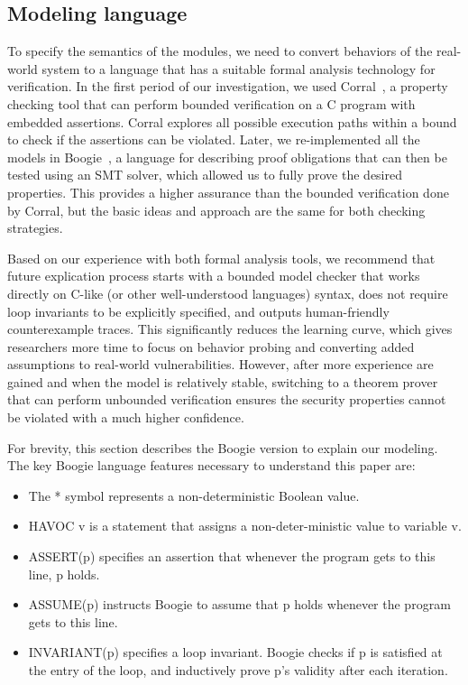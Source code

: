 \subsection{Modeling language}

To specify the semantics of the modules, we need to convert behaviors of the real-world system to a language that has a suitable formal analysis technology for verification.  In the first period of our investigation, we used Corral~\cite{Lal:2012:SRM:2362216.2362257}, a property checking tool that can perform bounded verification on a C program with embedded assertions.  Corral explores all possible execution paths within a bound to check if the assertions can be violated.  Later, we re-implemented all the models in Boogie~\cite{Boogie}, a language for describing proof obligations that can then be tested using an SMT solver, which allowed us to fully prove the desired properties.  This provides a higher assurance than the bounded verification done by Corral, but the basic ideas and approach are the same for both checking strategies.

Based on our experience with both formal analysis tools, we recommend that future explication process starts with a bounded model checker that works directly on C-like (or other well-understood languages) syntax, does not require loop invariants to be explicitly specified, and outputs human-friendly counterexample traces.  This significantly reduces the learning curve, which gives researchers more time to focus on behavior probing and converting added assumptions to real-world vulnerabilities.  However, after more experience are gained and when the model is relatively stable, switching to a theorem prover that can perform unbounded verification ensures the security properties cannot be violated with a much higher confidence.

For brevity, this section describes the Boogie version to explain our modeling.  The key Boogie language features necessary to understand this paper are:

\begin{itemize}

\item The * symbol represents a non-deterministic Boolean value. 
\item HAVOC v is a statement that assigns a non-deter-ministic value to variable v.
\item ASSERT(p) specifies an assertion that whenever the program gets to this line, p holds. 
\item ASSUME(p) instructs Boogie to assume that p holds whenever the program gets to this line. 
\item INVARIANT(p) specifies a loop invariant. Boogie checks if p is satisfied at the entry of the loop, and inductively prove p's validity after each iteration. 

\end{itemize}

